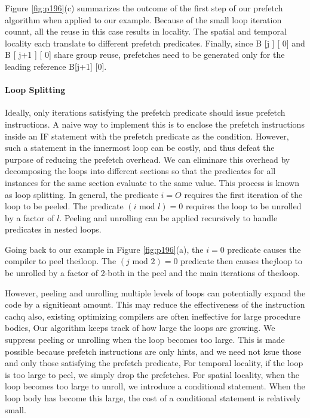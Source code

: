 Figure \ref{fig:p196}(c) summarizes the outcome of the first step of our
prefetch algorithm when applied to our example. Because of the
small loop iteration counnt, all the reuse in this case results 
in locality.
The spatial and temporal locality each translate to different prefetch
predicates. Finally, since B [j ] [ 0] and B [ j+1 ] [ 0] share group
reuse, prefetches need to be generated only for the leading reference
B[j+1] [0].

\paragraph{Loop Splitting}




Ideally, only iterations satisfying the prefetch predicate should issue
prefetch instructions. A naive way to implement this is to enclose
the prefetch instructions inside an IF statement with the prefetch
predicate as the condition. However, such a statement in the innermost loop can be costly, and thus defeat the purpose of reducing
the prefetch overhead. We can eliminare this overhead by decomposing the loops into different sections so that the predicates for
all instances for the same section evaluate to the same value. This
process is known as loop splitting. In general, the predicate $i = O$
requires the first iteration of the loop to be peeled. The predicate
$(i \text{ mod } l) = 0$ requires the loop to be unrolled by a factor of $l$.
Peeling and unrolling can be applied recursively to handle predicates in nested loops.

Going back to our example in Figure \ref{fig:p196}(a), the $i = 0$ predicate
causes the compiler to peel the$i$loop. The $(j \text{ mod } 2) = 0$ predicate
then causes the$j$loop to be unrolled by a factor of 2-both in the
peel and the main iterations of the$i$loop.

However, peeling and unrolling multiple levels of loops can
potentially expand the code by a signitieant amount. This may
reduce the effectiveness of the instruction cachq also, existing optimizing compilers are often ineffective for large procedure bodies,
Our algorithm keeps track of how large the loops are growing. We
suppress peeling or unrolling when the loop becomes too large.
This is made possible because prefetch instructions are only hints,
and we need not ksue those and only those satisfying the prefetch
predicate, For temporal locality, if the loop is too large to peel,
we simply drop the prefetches. For spatial locality, when the loop
becomes too large to unroll, we introduce a conditional statement.
When the loop body has become this large, the cost of a conditional
statement is relatively small.


